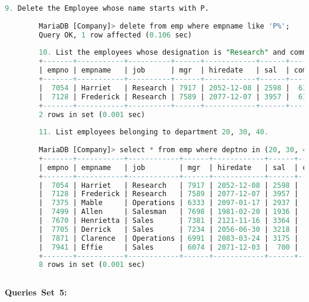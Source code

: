 \documentclass{article}
\begin{document}
\begin{lstlisting}[language=SQL]
		9. Delete the Employee whose name starts with P. 
		
		MariaDB [Company]> delete from emp where empname like 'P%'; 
		Query OK, 1 row affected (0.106 sec) 
		
		10. List the employees whose designation is "Research" and commission is > 500. 
		+-------+-----------+----------+------+------------+------+------+--------+ 
		| empno | empname   | job      | mgr  | hiredate   | sal  | comm | deptno | 
		+-------+-----------+----------+------+------------+------+------+--------+ 
		|  7054 | Harriet   | Research | 7917 | 2052-12-08 | 2598 |  610 |     20 | 
		|  7128 | Frederick | Research | 7589 | 2077-12-07 | 3957 |  610 |     20 | 
		+-------+-----------+----------+------+------------+------+------+--------+ 
		2 rows in set (0.001 sec) 
		
		11. List employees belonging to department 20, 30, 40. 
		
		MariaDB [Company]> select * from emp where deptno in (20, 30, 40); 
		+-------+-----------+------------+------+------------+------+------+--------+ 
		| empno | empname   | job        | mgr  | hiredate   | sal  | comm | deptno | 
		+-------+-----------+------------+------+------------+------+------+--------+ 
		|  7054 | Harriet   | Research   | 7917 | 2052-12-08 | 2598 |  610 |     20 | 
		|  7128 | Frederick | Research   | 7589 | 2077-12-07 | 3957 |  610 |     20 | 
		|  7375 | Mable     | Operations | 6333 | 2097-01-17 | 2937 |  210 |     40 | 
		|  7499 | Allen     | Salesman   | 7698 | 1981-02-20 | 1936 |  300 |     30 | 
		|  7670 | Henrietta | Sales      | 7381 | 2121-11-16 | 3364 |  217 |     30 | 
		|  7705 | Derrick   | Sales      | 7234 | 2056-06-30 | 3218 |  208 |     30 | 
		|  7871 | Clarence  | Operations | 6991 | 2083-03-24 | 3175 |  228 |     40 | 
		|  7941 | Effie     | Sales      | 6074 | 2071-12-03 |  700 |  265 |     30 | 
		+-------+-----------+------------+------+------------+------+------+--------+ 
		8 rows in set (0.001 sec) 
		
	\end{lstlisting} 
	\textbf{Queries Set 5:} 
\end{document}
